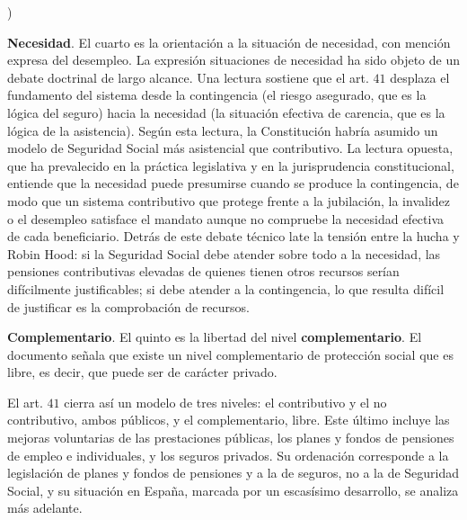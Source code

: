 \documentclass[10pt,a4paper]{article}
\newcounter{alphaitem}
\newenvironment{la}
      {\begin{list}{\alph{alphaitem})}{%
          \usecounter{alphaitem}%
          \setlength{\leftmargin}{1cm}%
          \setlength{\parskip}{3pt}%
          \setlength{\itemsep}{0pt}%
          \setlength{\parsep}{0pt}%
      }}
      {\end{list}}
\begin{document}
\begin{la}
    \item \textbf{Necesidad}. El cuarto es la orientación a la situación de necesidad, con mención expresa del desempleo. La expresión situaciones de necesidad ha sido objeto de un debate doctrinal de largo alcance. Una lectura sostiene que el art. $41$ desplaza el fundamento del sistema desde la contingencia (el riesgo asegurado, que es la lógica del seguro) hacia la necesidad (la situación efectiva de carencia, que es la lógica de la asistencia). Según esta lectura, la Constitución habría asumido un modelo de Seguridad Social más asistencial que contributivo. La lectura opuesta, que ha prevalecido en la práctica legislativa y en la jurisprudencia constitucional, entiende que la necesidad puede presumirse cuando se produce la contingencia, de modo que un sistema contributivo que protege frente a la jubilación, la invalidez o el desempleo satisface el mandato aunque no compruebe la necesidad efectiva de cada beneficiario. Detrás de este debate técnico late la tensión entre la hucha y Robin Hood: si la Seguridad Social debe atender sobre todo a la necesidad, las pensiones contributivas elevadas de quienes tienen otros recursos serían difícilmente justificables; si debe atender a la contingencia, lo que resulta difícil de justificar es la comprobación de recursos.
    \item \textbf{Complementario}. El quinto es la libertad del nivel \textbf{complementario}. El documento señala que existe un nivel complementario de protección social que es libre, es decir, que puede ser de carácter privado. 
\end{la}

El art. $41$ cierra así un modelo de tres niveles: el contributivo y el no contributivo, ambos públicos, y el complementario, libre. Este último incluye las mejoras voluntarias de las prestaciones públicas, los planes y fondos de pensiones de empleo e individuales, y los seguros privados. Su ordenación corresponde a la legislación de planes y fondos de pensiones y a la de seguros, no a la de Seguridad Social, y su situación en España, marcada por un escasísimo desarrollo, se analiza más adelante.
\end{document}
